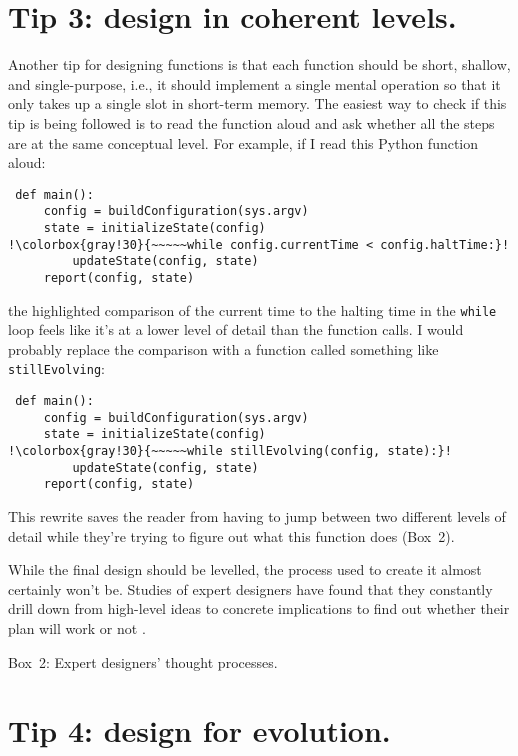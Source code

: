 \documentclass[10pt,letterpaper]{article}
\begin{document}
\section*{Tip 3: design in coherent levels.}

Another tip for designing functions is that
each function should be short, shallow, and single-purpose,
i.e.,
it should implement a single mental operation
so that it only takes up a single slot in short-term memory.
The easiest way to check if this tip is being followed
is to read the function aloud
and ask whether all the steps are at the same conceptual level.
For example,
if I read this Python function aloud:

\begin{lstlisting}
 def main():
     config = buildConfiguration(sys.argv)
     state = initializeState(config)
!\colorbox{gray!30}{~~~~~while config.currentTime < config.haltTime:}!
         updateState(config, state)
     report(config, state)
\end{lstlisting}

\noindent
the highlighted comparison of the current time to the halting time in the \texttt{while} loop
feels like it's at a lower level of detail than the function calls.
I would probably replace the comparison with a function called something like \texttt{stillEvolving}:

\begin{lstlisting}
 def main():
     config = buildConfiguration(sys.argv)
     state = initializeState(config)
!\colorbox{gray!30}{~~~~~while stillEvolving(config, state):}!
         updateState(config, state)
     report(config, state)
\end{lstlisting}

\noindent
This rewrite saves the reader
from having to jump between two different levels of detail
while they're trying to figure out what this function does \colorbox{green!30}{(Box~2)}.

\begin{mdframed}
  \noindent
  While the final design should be levelled,
  the process used to create it almost certainly won't be.
  Studies of expert designers have found that
  they constantly drill down from high-level ideas to concrete implications
  to find out whether their plan will work or not \cite{Schon1984}.

  \noindent
  \colorbox{green!30}{Box~2: Expert designers' thought processes.}
\end{mdframed}

\section*{Tip 4: design for evolution.}
\end{document}
